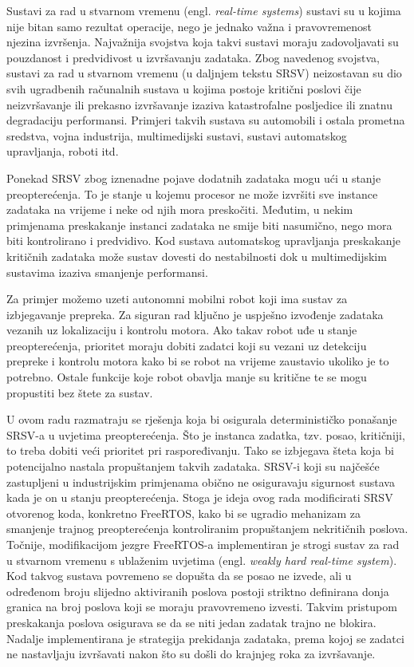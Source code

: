 \documentclass[../zavrsni.tex]{subfiles}
\begin{document}
\sloppy

\justifying

Sustavi za rad u stvarnom vremenu (engl. \textit{real-time systems}) sustavi su u kojima nije bitan samo
rezultat operacije, nego je jednako važna i pravovremenost njezina izvršenja. Najvažnija svojstva koja takvi sustavi moraju
zadovoljavati su pouzdanost i predvidivost u izvršavanju zadataka.
Zbog navedenog svojstva, sustavi za rad u stvarnom vremenu (u daljnjem tekstu SRSV) neizostavan su dio svih ugradbenih 
računalnih sustava u kojima postoje kritični poslovi čije neizvršavanje ili prekasno izvršavanje izaziva katastrofalne
posljedice ili znatnu degradaciju performansi. Primjeri takvih sustava su automobili i ostala prometna sredstva, vojna industrija, 
multimedijski sustavi, sustavi automatskog upravljanja, roboti itd. 

Ponekad SRSV zbog iznenadne pojave dodatnih zadataka mogu ući u stanje preopterećenja. To je stanje u kojemu procesor ne može 
izvršiti sve instance zadataka na vrijeme i neke od njih mora preskočiti. Međutim, u nekim primjenama preskakanje instanci zadataka ne smije biti nasumično, nego
mora biti kontrolirano i predvidivo. Kod sustava automatskog upravljanja preskakanje kritičnih zadataka može sustav dovesti do nestabilnosti dok u 
multimedijskim sustavima izaziva smanjenje performansi.
  
Za primjer možemo uzeti autonomni mobilni robot koji ima sustav za izbjegavanje prepreka. Za siguran rad ključno je uspješno izvođenje zadataka
vezanih uz lokalizaciju i kontrolu motora. Ako takav robot uđe u stanje preopterećenja, prioritet 
moraju dobiti zadatci koji su vezani uz detekciju prepreke i kontrolu motora kako bi se robot na vrijeme zaustavio ukoliko je to potrebno.
Ostale funkcije koje robot obavlja manje su kritične te se mogu propustiti bez štete za sustav.

U ovom radu razmatraju se rješenja koja bi osigurala determinističko ponašanje SRSV-a u uvjetima preopterećenja. Što je instanca zadatka, tzv. posao, kritičniji,
to treba dobiti veći prioritet pri raspoređivanju. Tako se izbjegava šteta koja bi potencijalno nastala propuštanjem takvih zadataka. 
SRSV-i koji su najčešće zastupljeni u industrijskim primjenama obično ne osiguravaju sigurnost sustava kada je on u stanju preopterećenja. Stoga je ideja ovog rada 
modificirati SRSV otvorenog koda, konkretno FreeRTOS, kako bi se ugradio mehanizam za smanjenje trajnog preopterećenja kontroliranim 
propuštanjem nekritičnih poslova. Točnije,  
modifikacijom jezgre FreeRTOS-a implementiran je strogi sustav za rad u stvarnom vremenu s ublaženim uvjetima (engl. \textit{weakly hard real-time system}). Kod takvog sustava
povremeno se dopušta da se posao ne izvede, ali u određenom broju slijedno aktiviranih poslova postoji striktno definirana donja granica na broj 
poslova koji se moraju pravovremeno izvesti.
Takvim pristupom preskakanja poslova osigurava se da se niti jedan zadatak trajno ne blokira. Nadalje implementirana je strategija 
prekidanja zadataka, prema kojoj se zadatci ne nastavljaju izvršavati nakon što su došli do krajnjeg roka za izvršavanje.
\end{document}
